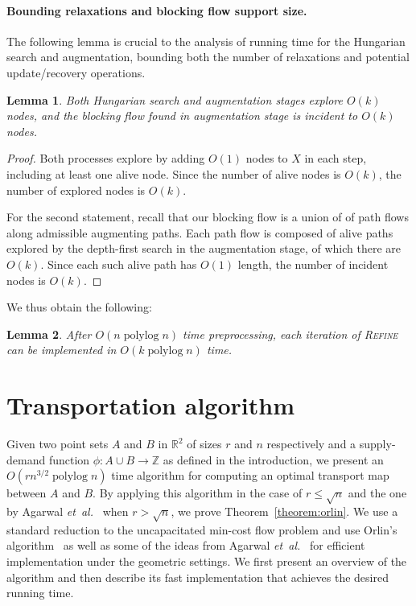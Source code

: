 \documentclass[11pt]{article}
\def\etal{\emph{et~al.}}
\def\etal{\textit{et~al.}}
\def\polylog{\mathop{\mathrm{polylog}}}
\def\reals{\mathbb{R}}
\def\ints{\mathbb{Z}}
\def\tsupply{\phi}
\newtheorem{lemma}{Lemma}[section]
\numberwithin{figure}{section}
\begin{document}
\paragraph*{Bounding relaxations and blocking flow support size.}
The following lemma is crucial to the analysis of running time for the
Hungarian search and augmentation, bounding both the number of relaxations and
potential update/recovery operations.

\begin{lemma}
\label{lemma:cost_scale_count}
Both Hungarian search and augmentation stages explore $O(k)$ nodes,
and the blocking flow found in augmentation stage is incident to $O(k)$ nodes.
\end{lemma}
\begin{proof}
Both processes explore by adding $O(1)$ nodes to $X$ in each step,
including at least one alive node.
Since the number of alive nodes is $O(k)$, the number of explored nodes is $O(k)$.

For the second statement, recall that our blocking flow is a union of of path
flows along admissible augmenting paths.
Each path flow is composed of alive paths explored by the depth-first search
in the augmentation stage, of which there are $O(k)$.
Since each such alive path has $O(1)$ length, the number of incident nodes is $O(k)$.
\end{proof}

We thus obtain the following:

\begin{lemma}
\label{lemma:refine_iter_time}
After $O(n\polylog n)$ time preprocessing, each iteration of \textsc{Refine} can be
implemented in $O(k\polylog n)$ time.
\end{lemma}


\section{Transportation algorithm}
\label{section:orlin}

Given two point sets $A$ and $B$ in $\reals^2$ of sizes $r$ and $n$ respectively
and a supply-demand function $\tsupply: A \cup B \to \ints$
as defined in the introduction, we present an $O(rn^{3/2}\polylog n)$ time
algorithm for computing an optimal transport map between $A$ and $B$.
By applying this algorithm in the case of $r \leq \sqrt{n}$ and the one by
Agarwal \etal~\cite{AFPVX17arxiv} when $r > \sqrt{n}$, we prove Theorem~\ref{theorem:orlin}.
We use a standard reduction to the uncapacitated min-cost flow problem and use
Orlin's algorithm~\cite{O93} as well as some of
the ideas from Agarwal \etal~\cite{AFPVX17arxiv} for efficient implementation under the geometric settings.
We first present an overview of the algorithm and then describe its fast
implementation that achieves the desired running time.
\end{document}
